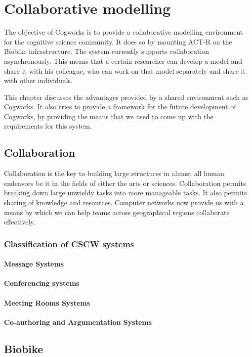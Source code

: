 
\chapter{Collaborative modelling}
\label{chap-four}


The objective of Cogworks is to provide a collaborative modelling
environment for the cognitive science community. It does so by
mounting ACT-R on the Biobike infrastructure. The system currently
supports collaboration asynchronously. This means that a certain
researcher can develop a model and share it with his colleague, who
can work on that model separately and share it with other individuals.

This chapter discusses the advantages provided by a shared environment
such as Cogworks. It also tries to provide a framework for the future
development of Cogworks, by providing the means that we used to come
up with the requirements for this system.

\section{Collaboration}

Collaboration is the key to building large structures in almost all
human endeavors be it in the fields of either the arts or
sciences. Collaboration permits breaking down large unwieldy tasks
into more manageable tasks. It also permits sharing of knowledge and
resources. Computer networks now provide us with a means by which we
can help teams across geographical regions collaborate effectively.

\subsection{Classification of CSCW systems}

\subsubsection{Message Systems}

\subsubsection{Conferencing systems}

\subsubsection{Meeting Rooms Systems}

\subsubsection{Co-authoring and Argumentation Systems}

\section{Biobike}

